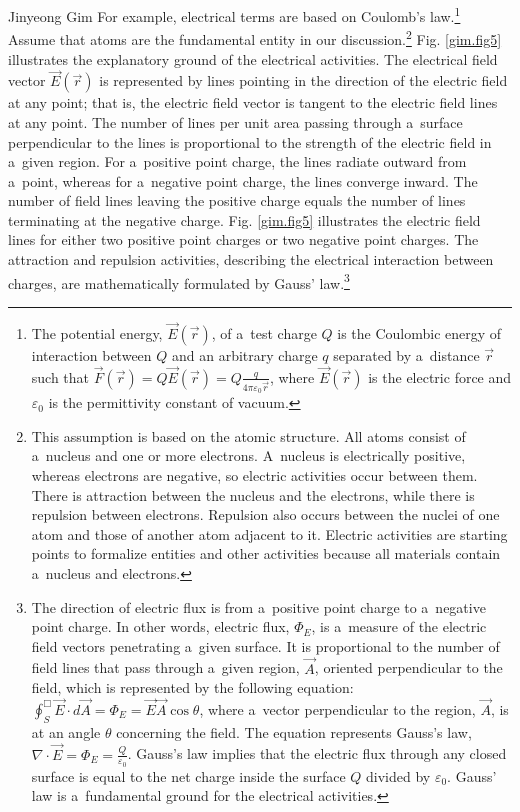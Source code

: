 \begin{artengenv}{Jinyeong Gim}
For example, electrical terms are based on Coulomb's law.\footnote{The potential energy, $\overrightarrow E(\overrightarrow r)$, of a~test charge $Q$ is the Coulombic energy of interaction between $Q$ and an arbitrary charge $q$ separated by a~distance $\overrightarrow r$ such that $\overrightarrow F(\overrightarrow r)=Q\overrightarrow E(\overrightarrow r)=Q\frac q{4\pi \varepsilon_0\overrightarrow r}$, where $\overrightarrow E(\overrightarrow r)$ is the electric force and $\varepsilon_0$ is the permittivity constant of vacuum.} Assume that atoms are the fundamental entity in our discussion.\footnote{This assumption is based on the atomic structure. All atoms consist of a~nucleus and one or more electrons. A~nucleus is electrically positive, whereas electrons are negative, so electric activities occur between them. There is attraction between the nucleus and the electrons, while there is repulsion between electrons. Repulsion also occurs between the nuclei of one atom and those of another atom adjacent to it. Electric activities are starting points to formalize entities and other activities because all materials contain a~nucleus and electrons.} Fig. \ref{gim.fig5} illustrates the explanatory ground of the electrical activities. The electrical field vector $\overrightarrow E(\overrightarrow r)$ is represented by lines pointing in the direction of the electric field at any point; that is, the electric field vector is tangent to the electric field lines at any point. The number of lines per unit area passing through a~surface perpendicular to the lines is proportional to the strength of the electric field in a~given region. For a~positive point charge, the lines radiate outward from a~point, whereas for a~negative point charge, the lines converge inward. The number of field lines leaving the positive charge equals the number of lines terminating at the negative charge. Fig. \ref{gim.fig5} illustrates the electric field lines for either two positive point charges or two negative point charges. The attraction and repulsion activities, describing the electrical interaction between charges, are mathematically formulated by Gauss' law.\footnote{The direction of electric flux is from a~positive point charge to a~negative point charge. In other words, electric flux, $\Phi _E$, is a~measure of the electric field vectors penetrating a~given surface. It is proportional to the number of field lines that pass through a~given region, $\overrightarrow A$, oriented perpendicular to the field, which is represented by the following equation: $\oint _S^{\Box} \overrightarrow E{\cdot}d\overrightarrow A=\Phi _E=\overrightarrow E\overrightarrow A\cos \theta $, where a~vector perpendicular to the region, $\overrightarrow A$, is at an angle $\theta $ concerning the field. The equation represents Gauss's law, ${\nabla}{\cdot}\overrightarrow E=\Phi _E=\frac Q{\varepsilon _0}$. Gauss's law implies that the electric flux through any closed surface is equal to the net charge inside the surface $Q$ divided by $\varepsilon _0$. Gauss' law is a~fundamental ground for the electrical activities.}


\end{artengenv}
